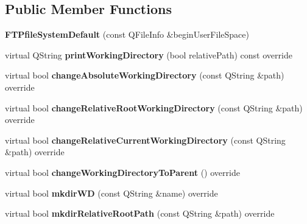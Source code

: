 \subsection*{Public Member Functions}
\begin{DoxyCompactItemize}
\item 
\mbox{\label{classFTPfileSystemDefault_ac815690308b16bad4ed9754ac462ff29}} 
{\bfseries F\+T\+Pfile\+System\+Default} (const Q\+File\+Info \&begin\+User\+File\+Space)
\item 
\mbox{\label{classFTPfileSystemDefault_a8133a418858f97b9fb5a60efdc47d5c1}} 
virtual Q\+String {\bfseries print\+Working\+Directory} (bool relative\+Path) const override
\item 
\mbox{\label{classFTPfileSystemDefault_a8a217c19ac3a375033790b50f4ea5007}} 
virtual bool {\bfseries change\+Absolute\+Working\+Directory} (const Q\+String \&path) override
\item 
\mbox{\label{classFTPfileSystemDefault_aedfd0d666deeb47c00204c72fd758450}} 
virtual bool {\bfseries change\+Relative\+Root\+Working\+Directory} (const Q\+String \&path) override
\item 
\mbox{\label{classFTPfileSystemDefault_a5760b8bee8657ea1be5b789a695b22c1}} 
virtual bool {\bfseries change\+Relative\+Current\+Working\+Directory} (const Q\+String \&path) override
\item 
\mbox{\label{classFTPfileSystemDefault_a93e87fb1c7cf499e9558b611ee514259}} 
virtual bool {\bfseries change\+Working\+Directory\+To\+Parent} () override
\item 
\mbox{\label{classFTPfileSystemDefault_a7834af9643939e5a586a28eb23198abe}} 
virtual bool {\bfseries mkdir\+WD} (const Q\+String \&name) override
\item 
\mbox{\label{classFTPfileSystemDefault_a8b9682168e31ded3c24088dca5cf9c57}} 
virtual bool {\bfseries mkdir\+Relative\+Root\+Path} (const Q\+String \&path) override
\item 
\mbox{\label{classFTPfileSystemDefault_a9e2b21a3d300413370aa81b00c7360d9}} 

\end{DoxyCompactItemize}
